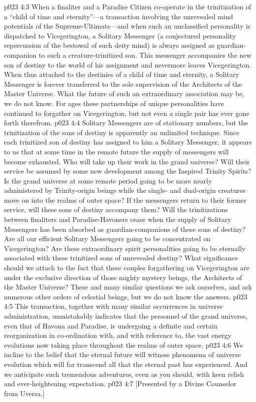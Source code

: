 \pc \vs p023 4:3 When a finaliter and a Paradise Citizen co\hyp{}operate in the trinitization of a “child of time and eternity”---a transaction involving the unrevealed mind potentials of the Supreme\hyp{}Ultimate---and when such an unclassified personality is dispatched to Vicegerington, a Solitary Messenger (a conjectured personality repercussion of the bestowal of such deity mind) is always assigned as guardian\hyp{}companion to such a creature\hyp{}trinitized son. This messenger accompanies the new son of destiny to the world of his assignment and nevermore leaves Vicegerington. When thus attached to the destinies of a child of time and eternity, a Solitary Messenger is forever transferred to the sole supervision of the Architects of the Master Universe. What the future of such an extraordinary association may be, we do not know. For ages these partnerships of unique personalities have continued to forgather on Vicegerington, but not even a single pair has ever gone forth therefrom.
\vs p023 4:4 Solitary Messengers are of stationary numbers, but the trinitization of the sons of destiny is apparently an unlimited technique. Since each trinitized son of destiny has assigned to him a Solitary Messenger, it appears to us that at some time in the remote future the supply of messengers will become exhausted. Who will take up their work in the grand universe? Will their service be assumed by some new development among the Inspired Trinity Spirits? Is the grand universe at some remote period going to be more nearly administered by Trinity\hyp{}origin beings while the single\hyp{} and dual\hyp{}origin creatures move on into the realms of outer space? If the messengers return to their former service, will these sons of destiny accompany them? Will the trinitizations between finaliters and Paradise\hyp{}Havoners cease when the supply of Solitary Messengers has been absorbed as guardian\hyp{}companions of these sons of destiny? Are all our efficient Solitary Messengers going to be concentrated on Vicegerington? Are these extraordinary spirit personalities going to be eternally associated with these trinitized sons of unrevealed destiny? What significance should we attach to the fact that these couples forgathering on Vicegerington are under the exclusive direction of those mighty mystery beings, the Architects of the Master Universe? These and many similar questions we ask ourselves, and ask numerous other orders of celestial beings, but we do not know the answers.
\pc \vs p023 4:5 This transaction, together with many similar occurrences in universe administration, unmistakably indicates that the personnel of the grand universe, even that of Havona and Paradise, is undergoing a definite and certain reorganization in co\hyp{}ordination with, and with reference to, the vast energy evolutions now taking place throughout the realms of outer space.
\vs p023 4:6 We incline to the belief that the eternal future will witness phenomena of universe evolution which will far transcend all that the eternal past has experienced. And we anticipate such tremendous adventures, even as you should, with keen relish and ever\hyp{}heightening expectation.
\vsetoff
\vs p023 4:7 [Presented by a Divine Counselor from Uversa.]
